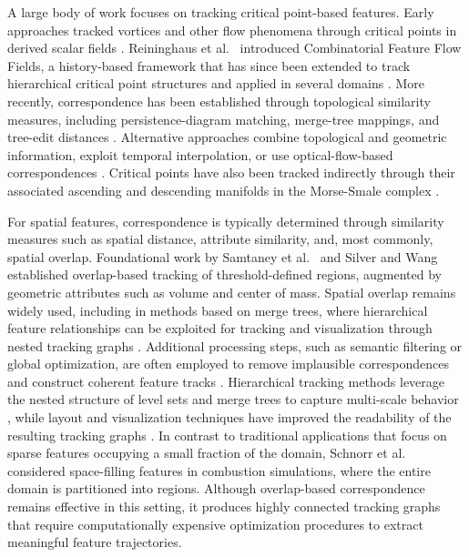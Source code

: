 \documentclass{vgtc}                          %
\begin{document}
A large body of work focuses on tracking critical point-based features. Early approaches tracked vortices and other flow phenomena through critical points in derived scalar fields \cite{Garth2004b,Weinkauf2011}. Reininghaus et al.~\cite{Reininghaus2011} introduced Combinatorial Feature Flow Fields, a history-based framework that has since been extended to track hierarchical critical point structures and applied in several domains \cite{Engelke2020,Nilsson2022Cyclone}. More recently, correspondence has been established through topological similarity measures, including persistence-diagram matching, merge-tree mappings, and tree-edit distances \cite{Cohen-Steiner2010,Sridharamurthy2020,Wetzels2022a,Wetzels2023}. Alternative approaches combine topological and geometric information, exploit temporal interpolation, or use optical-flow-based correspondences \cite{Yan2022b,Valsangkar2019}. Critical points have also been tracked indirectly through their associated ascending and descending manifolds in the Morse-Smale complex \cite{Nilsson2023}.

For spatial features, correspondence is typically determined through similarity measures such as spatial distance, attribute similarity, and, most commonly, spatial overlap. Foundational work by Samtaney et al.~\cite{Samtaney1994} and Silver and Wang~\cite{silver1998tracking} established overlap-based tracking of threshold-defined regions, augmented by geometric attributes such as volume and center of mass. Spatial overlap remains widely used, including in methods based on merge trees, where hierarchical feature relationships can be exploited for tracking and visualization through nested tracking graphs \cite{Widanagamaachchi2012,Saikia2017,Lukasczyk2017nested}. Additional processing steps, such as semantic filtering or global optimization, are often employed to remove implausible correspondences and construct coherent feature tracks \cite{Nilsson2022Cyclone,Schnorr2020}. Hierarchical tracking methods leverage the nested structure of level sets and merge trees to capture multi-scale behavior \cite{Lukasczyk2019dynamic}, while layout and visualization techniques have improved the readability of the resulting tracking graphs \cite{Kopp2019,Dobler2024}. In contrast to traditional applications that focus on sparse features occupying a small fraction of the domain, Schnorr et al.~\cite{Schnorr2020} considered space-filling features in combustion simulations, where the entire domain is partitioned into regions. Although overlap-based correspondence remains effective in this setting, it produces highly connected tracking graphs that require computationally expensive optimization procedures to extract meaningful feature trajectories.
\end{document}
